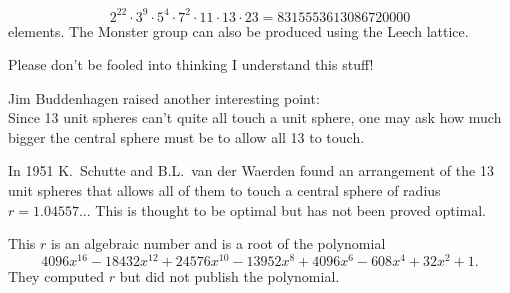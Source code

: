 \[2^{22} \cdot 3^9 \cdot 5^4 \cdot 7^2 \cdot 11 \cdot 13 \cdot 23 = 8315553613086720000\]
%
elements. The Monster group can also be produced using the Leech lattice.

Please don't be fooled into thinking I understand this stuff!

Jim Buddenhagen raised another interesting point:
\\
Since 13 unit spheres can't quite all touch a unit sphere, one may ask how much bigger the central sphere must be to allow all 13 to touch.

In 1951 K.\ Schutte and B.L.\ van der Waerden found an arrangement of the 13 unit spheres that allows all of them to touch a central sphere of radius $r=1.04557...$ This is thought to be optimal but has not been proved optimal.

This $r$ is an algebraic number and is a root of the polynomial
%
\[4096 x^{16} - 18432 x^{12} + 24576 x^{10} - 13952 x^8 + 4096 x^6 - 608 x^4 + 32 x^2 + 1.\]
%
They computed $r$ but did not publish the polynomial.